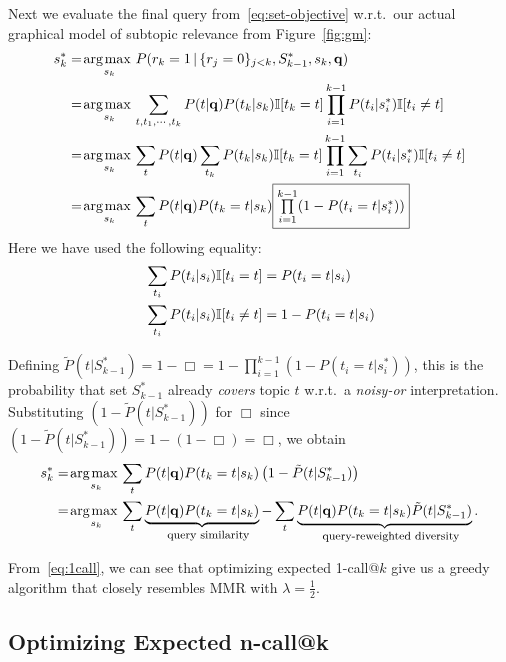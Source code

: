 Next we evaluate the final query from~\eqref{eq:set-objective} w.r.t.\
our actual graphical model of subtopic relevance from Figure~\ref{fig:gm}:
\begin{align}
s_k^* & = \argmax_{s_{k}} P( r_k=1 \, | \, \{ r_{j}=0 \}_{j<k}, S_{k-1}^*,s_k,\vec{q}) \nonumber \\
& = \argmax_{s_{k}} \sum_{t, t_1, \cdots, t_{k}} P(t|\vec{q}) P(t_k|s_k) \I[t_k = t] \prod_{i=1}^{k-1} P(t_i|s_i^*) \I[t_i\neq t]\nonumber \\
& = \argmax_{s_{k}} \sum_{t} P(t|\vec{q}) \sum_{t_{k}} P(t_k|s_k) \I[t_k = t] \prod_{i=1}^{k-1} \sum_{t_{i}} P(t_i|s_i^*) \I[t_i \neq t]\nonumber \\
& = \argmax_{s_{k}} \sum_{t} P(t|\vec{q}) P(t_k=t|s_k) \fbox{$\prod\limits_{i=1}^{k-1} (1 - P(t_i=t|s_i^*))$} \label{eq:partial_simp}
\end{align}
Here we have used the following equality:
\begin{align*}
& \sum_{t_{i}} P(t_i|s_i) \mathbb{I}[t_i = t] =  P(t_i=t|s_i) \\
& \sum_{t_{i}} P(t_i|s_i) \mathbb{I}[t_i \neq t] = 1 - P(t_i=t|s_i)
\end{align*}

Defining $\tilde{P}(t | S_{k-1}^*) = 1 - \Box = 1 - \prod_{i=1}^{k-1} (1 -
  P(t_i=t|s_i^*))$, this is the probability that 
set $S_{k-1}^*$ already \emph{covers} topic $t$ 
w.r.t.\ a \emph{noisy-or} interpretation.  Substituting
$(1 - \tilde{P}(t | S_{k-1}^*))$ for $\Box$ since 
$(1 - \tilde{P}(t | S_{k-1}^*)) = 1 - (1 - \Box) = \Box$, we obtain
\begin{align}
s_k^* & = \argmax_{s_{k}} \sum_{t} P(t|\vec{q}) P(t_k=t|s_k) \left( 1 - \tilde{P}(t | S_{k-1}^*) \right) \nonumber \\
      & = \argmax_{s_{k}} \sum_{t} \underbrace{P(t|\vec{q}) P(t_k=t|s_k)}_{\mbox{\footnotesize query similarity}} - \sum_{t} \underbrace{P(t|\vec{q}) P(t_k=t|s_k) \tilde{P}(t | S_{k-1}^*)}_{\mbox{\footnotesize query-reweighted diversity}}. \label{eq:1call}
\end{align}

From~\eqref{eq:1call}, we can see that optimizing expected 1-call@$k$ give us a greedy algorithm that closely resembles MMR with $\lambda = \frac{1}{2}$.

\subsection{Optimizing Expected n-call@k}


